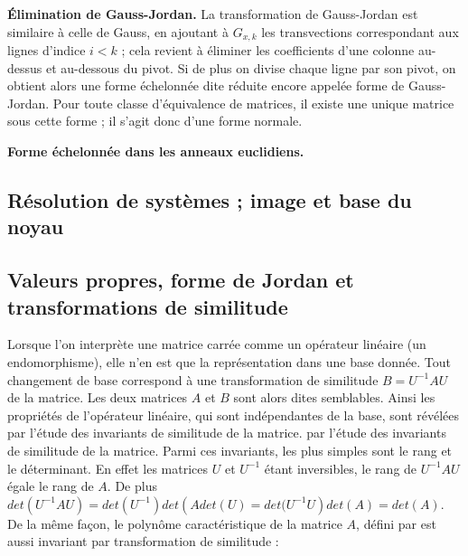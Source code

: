 \textbf{Élimination de Gauss-Jordan.} La transformation de Gauss-Jordan est similaire à celle de Gauss, en ajoutant à $G_{x,k}$ les transvections correspondant aux lignes d’indice $i < k$ ; cela revient à éliminer les coefficients d’une colonne au-dessus et au-dessous du pivot. Si de plus on divise chaque ligne par son pivot, on obtient alors une forme échelonnée dite réduite encore appelée forme de Gauss-Jordan. Pour toute classe d’équivalence de matrices, il existe une unique matrice sous cette forme ; il s’agit donc d’une forme normale.

\textbf{Forme échelonnée dans les anneaux euclidiens.}
\subsection{ Résolution de systèmes ; image et base du noyau}
\subsection{Valeurs propres, forme de Jordan et transformations de similitude}
Lorsque l’on interprète une matrice carrée comme un opérateur linéaire (un endomorphisme), elle n’en est que la représentation dans une base donnée. Tout changement de base correspond à une transformation de similitude 
$B = U^{-1}AU$ de la matrice. Les deux matrices $A$ et $B$ sont alors dites semblables. Ainsi les propriétés de l’opérateur linéaire, qui sont indépendantes de la base, sont révélées par l’étude des invariants de similitude de la matrice.
par l’étude des invariants de similitude de la matrice. Parmi ces invariants, les plus simples sont le rang et le déterminant. En effet les matrices $U$ et $U^{-1}$ étant inversibles, le rang de $U^{-1}AU$ égale le rang de $A$. De plus $det\left( U^{-1}AU\right)  = det\left( U^{-1}\right) det \left(A det(U) = det(U^{-1}U\right) det\left( A\right) = det\left(A\right)$. De
la même façon, le polynôme caractéristique de la matrice $A$, défini par 
 est aussi invariant par transformation de similitude :
%

